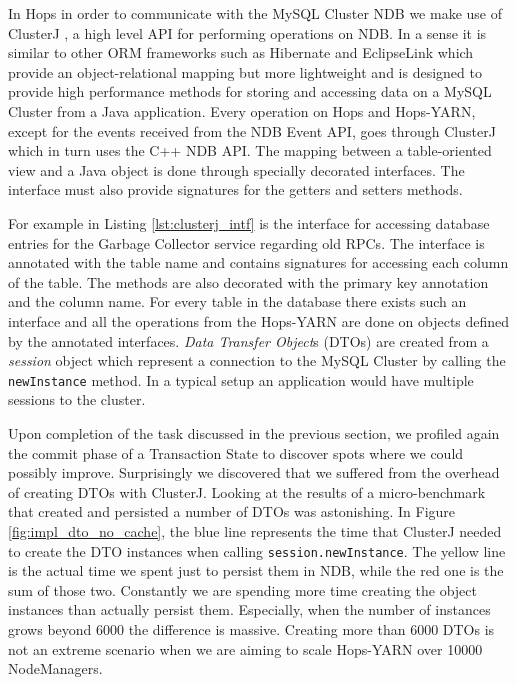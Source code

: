 In Hops in order to communicate with the MySQL Cluster NDB we make use
of ClusterJ \cite{clusterj}, a high level API for performing
operations on NDB. In a sense it is similar to other ORM frameworks
such as Hibernate \cite{hibernate} and EclipseLink \cite{eclipselink}
which provide an object-relational mapping but more lightweight and is
designed to provide high performance methods for storing and accessing
data on a MySQL Cluster from a Java application. Every operation on
Hops and Hops-YARN, except for the events received from the NDB Event
API, goes through ClusterJ which in turn uses the C++ NDB API. The
mapping between a table-oriented view and a Java object is done
through specially decorated interfaces. The interface must also provide signatures
for the getters and setters methods.

For example in Listing \ref{lst:clusterj_intf} is the interface for
accessing database entries for the Garbage Collector service regarding
old RPCs. The interface is annotated with the table name and contains
signatures for accessing each column of the table. The methods are
also decorated with the primary key annotation and the column
name. For every table in the database there exists such an interface
and all the operations from the Hops-YARN are done on objects defined
by the annotated interfaces. \emph{Data Transfer Object}s (DTOs) are
created from a \emph{session} object which represent a connection to
the MySQL Cluster by calling the \texttt{newInstance} method. In a
typical setup an application would have multiple sessions to the
cluster. 



Upon completion of the task discussed in the previous section, we
profiled again the commit phase of a Transaction State to discover
spots where we could possibly improve. Surprisingly we discovered that
we suffered from the overhead of creating DTOs with ClusterJ. Looking
at the results of a micro-benchmark that created and persisted a
number of DTOs was astonishing. In Figure \ref{fig:impl_dto_no_cache},
the blue line represents the time that ClusterJ needed to create the
DTO instances when calling \texttt{session.newInstance}. The yellow
line is the actual time we spent just to persist them in NDB, while
the red one is the sum of those two. Constantly we are spending more
time creating the object instances than actually persist
them. Especially, when the number of instances grows beyond 6000 the
difference is massive. Creating more than 6000 DTOs is not an extreme
scenario when we are aiming to scale Hops-YARN over 10000
NodeManagers.

